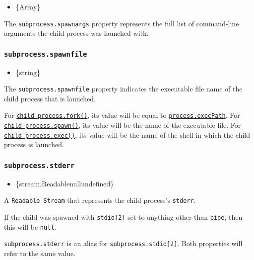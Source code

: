 \begin{itemize}
\tightlist
\item
  \{Array\}
\end{itemize}

The \texttt{subprocess.spawnargs} property represents the full list of
command-line arguments the child process was launched with.

\subsubsection{\texorpdfstring{\texttt{subprocess.spawnfile}}{subprocess.spawnfile}}\label{subprocess.spawnfile}

\begin{itemize}
\tightlist
\item
  \{string\}
\end{itemize}

The \texttt{subprocess.spawnfile} property indicates the executable file
name of the child process that is launched.

For
\hyperref[child_processforkmodulepath-args-options]{\texttt{child\_process.fork()}},
its value will be equal to
\href{process.md\#processexecpath}{\texttt{process.execPath}}. For
\hyperref[child_processspawncommand-args-options]{\texttt{child\_process.spawn()}},
its value will be the name of the executable file. For
\hyperref[child_processexeccommand-options-callback]{\texttt{child\_process.exec()}},
its value will be the name of the shell in which the child process is
launched.

\subsubsection{\texorpdfstring{\texttt{subprocess.stderr}}{subprocess.stderr}}\label{subprocess.stderr}

\begin{itemize}
\tightlist
\item
  \{stream.Readable\textbar null\textbar undefined\}
\end{itemize}

A \texttt{Readable\ Stream} that represents the child process's
\texttt{stderr}.

If the child was spawned with \texttt{stdio{[}2{]}} set to anything
other than \texttt{\textquotesingle{}pipe\textquotesingle{}}, then this
will be \texttt{null}.

\texttt{subprocess.stderr} is an alias for
\texttt{subprocess.stdio{[}2{]}}. Both properties will refer to the same
value.

